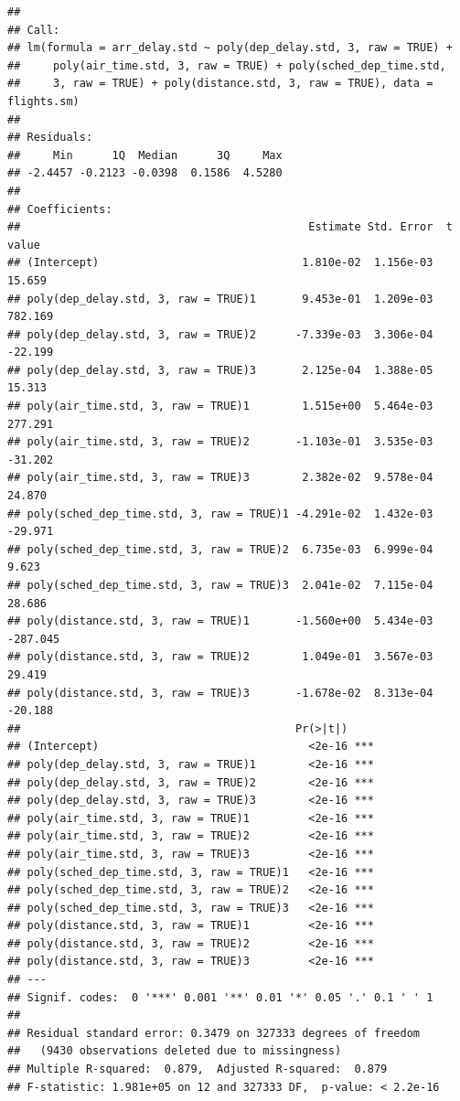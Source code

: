 \documentclass[
]{article}
\begin{document}
\begin{verbatim}
## 
## Call:
## lm(formula = arr_delay.std ~ poly(dep_delay.std, 3, raw = TRUE) + 
##     poly(air_time.std, 3, raw = TRUE) + poly(sched_dep_time.std, 
##     3, raw = TRUE) + poly(distance.std, 3, raw = TRUE), data = flights.sm)
## 
## Residuals:
##     Min      1Q  Median      3Q     Max 
## -2.4457 -0.2123 -0.0398  0.1586  4.5280 
## 
## Coefficients:
##                                            Estimate Std. Error  t value
## (Intercept)                               1.810e-02  1.156e-03   15.659
## poly(dep_delay.std, 3, raw = TRUE)1       9.453e-01  1.209e-03  782.169
## poly(dep_delay.std, 3, raw = TRUE)2      -7.339e-03  3.306e-04  -22.199
## poly(dep_delay.std, 3, raw = TRUE)3       2.125e-04  1.388e-05   15.313
## poly(air_time.std, 3, raw = TRUE)1        1.515e+00  5.464e-03  277.291
## poly(air_time.std, 3, raw = TRUE)2       -1.103e-01  3.535e-03  -31.202
## poly(air_time.std, 3, raw = TRUE)3        2.382e-02  9.578e-04   24.870
## poly(sched_dep_time.std, 3, raw = TRUE)1 -4.291e-02  1.432e-03  -29.971
## poly(sched_dep_time.std, 3, raw = TRUE)2  6.735e-03  6.999e-04    9.623
## poly(sched_dep_time.std, 3, raw = TRUE)3  2.041e-02  7.115e-04   28.686
## poly(distance.std, 3, raw = TRUE)1       -1.560e+00  5.434e-03 -287.045
## poly(distance.std, 3, raw = TRUE)2        1.049e-01  3.567e-03   29.419
## poly(distance.std, 3, raw = TRUE)3       -1.678e-02  8.313e-04  -20.188
##                                          Pr(>|t|)    
## (Intercept)                                <2e-16 ***
## poly(dep_delay.std, 3, raw = TRUE)1        <2e-16 ***
## poly(dep_delay.std, 3, raw = TRUE)2        <2e-16 ***
## poly(dep_delay.std, 3, raw = TRUE)3        <2e-16 ***
## poly(air_time.std, 3, raw = TRUE)1         <2e-16 ***
## poly(air_time.std, 3, raw = TRUE)2         <2e-16 ***
## poly(air_time.std, 3, raw = TRUE)3         <2e-16 ***
## poly(sched_dep_time.std, 3, raw = TRUE)1   <2e-16 ***
## poly(sched_dep_time.std, 3, raw = TRUE)2   <2e-16 ***
## poly(sched_dep_time.std, 3, raw = TRUE)3   <2e-16 ***
## poly(distance.std, 3, raw = TRUE)1         <2e-16 ***
## poly(distance.std, 3, raw = TRUE)2         <2e-16 ***
## poly(distance.std, 3, raw = TRUE)3         <2e-16 ***
## ---
## Signif. codes:  0 '***' 0.001 '**' 0.01 '*' 0.05 '.' 0.1 ' ' 1
## 
## Residual standard error: 0.3479 on 327333 degrees of freedom
##   (9430 observations deleted due to missingness)
## Multiple R-squared:  0.879,  Adjusted R-squared:  0.879 
## F-statistic: 1.981e+05 on 12 and 327333 DF,  p-value: < 2.2e-16
\end{verbatim}
\end{document}
